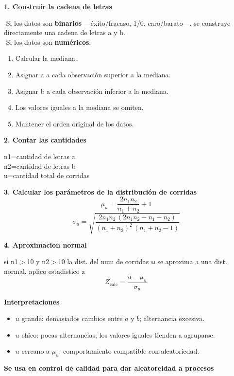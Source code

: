 \documentclass[10pt,a4paper]{article}
\begin{document}
\begin{minipage}[t]{0.55\textwidth}
\textbf{1. Construir la cadena de letras}

-Si los datos son \textbf{binarios} ---éxito/fracaso, 1/0, caro/barato---, se construye directamente una cadena de letras a y b.\\
-Si los datos son \textbf{numéricos}:
\begin{enumerate}[leftmargin=18pt,itemsep=0pt,topsep=1pt,parsep=0pt]
  \item Calcular la mediana.
  \item Asignar a a cada observación superior a la mediana.
  \item Asignar b a cada observación inferior a la mediana.
  \item Los valores iguales a la mediana se omiten.
  \item Mantener el orden original de los datos.
\end{enumerate}

\textbf{2. Contar las cantidades}

n1=cantidad de letras a\\
n2=cantidad de letras b\\
u=cantidad total de corridas

\textbf{3. Calcular los parámetros de la distribución de corridas}
\[
\mu_u = \frac{2n_1 n_2}{n_1+n_2} + 1
\]
\[
\sigma_u = \sqrt{\frac{2n_1 n_2\,(2n_1 n_2 - n_1 - n_2)}{(n_1+n_2)^2\,(n_1+n_2-1)}}
\]
\end{minipage}\hfill
\begin{minipage}[t]{0.42\textwidth}
\textbf{4. Aproximacion normal}

si n1$>$10 y n2$>$10 la dist. del num de corridas \textbf{u} se aproxima a una dist. normal, aplico estadistico z
\[
Z_{\text{calc}} = \frac{u - \mu_u}{\sigma_u}
\]

\textbf{Interpretaciones}
\begin{itemize}[leftmargin=12pt,itemsep=1pt,topsep=1pt,parsep=0pt]
  \item {\small $u$ grande: demasiados cambios entre $a$ y $b$; alternancia excesiva.}
  \item {\small $u$ chico: pocas alternancias; los valores iguales tienden a agruparse.}
  \item {\small $u$ cercano a $\mu_u$: comportamiento compatible con aleatoriedad.}
\end{itemize}

\vspace{4pt}
\textbf{Se usa en control de calidad para dar aleatoreidad a procesos}
\end{minipage}
\end{document}
